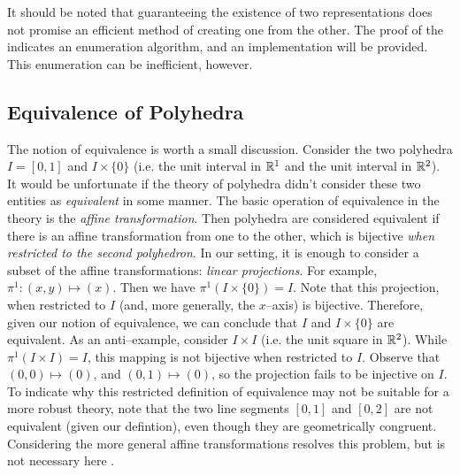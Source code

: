 It should be noted that guaranteeing the existence of two representations does not promise an efficient method of creating one from the other.  The proof of the \MWT{} indicates an enumeration algorithm, and an implementation will be provided.  This enumeration can be inefficient, however.

\subsection{Equivalence of Polyhedra}  The notion of equivalence is worth a small discussion.  Consider the two polyhedra $I = [0,1]$ and $I\times\{0\}$ (i.e. the unit interval in $\mathbb{R}^1$ and the unit interval in $\mathbb{R}^2$).  It would be unfortunate if the theory of polyhedra didn't consider these two entities as \textit{equivalent} in some manner.  The basic operation of equivalence in the theory is the \textit{affine transformation}.  Then polyhedra are considered equivalent if there is an affine transformation from one to the other, which is bijective \textit{when restricted to the second polyhedron}.  In our setting, it is enough to consider a subset of the affine transformations: \textit{linear projections}.  For example, $\pi^1: (x,y) \mapsto (x)$.  Then we have $\pi^1 (I \times \{0\}) = I$.  Note that this projection, when restricted to $I$ (and, more generally, the $x$--axis) is bijective.  Therefore, given our notion of equivalence, we can conclude that $I$ and $I\times \{0\}$ are equivalent.  As an anti--example, consider $I\times I$ (i.e. the unit square in $\mathbb{R}^2$).  While $\pi^1(I\times I) = I$, this mapping is not bijective when restricted to $I$.  Observe that $(0,0) \mapsto (0)$, and $(0,1) \mapsto (0)$, so the projection fails to be injective on $I$.  To indicate why this restricted definition of equivalence may not be suitable for a more robust theory, note that the two line segments $[0,1]$ and $[0,2]$ are not equivalent (given our defintion), even though they are geometrically congruent.  Considering the more general affine transformations resolves this problem, but is not necessary here .

